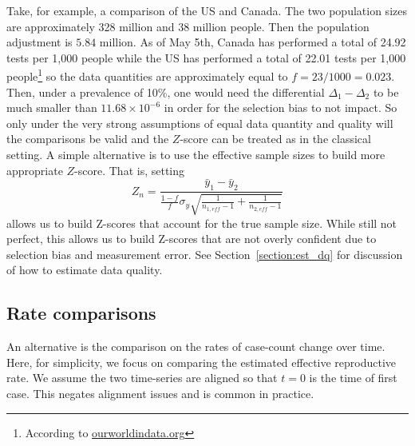 \documentclass[12pt]{amsart}
\numberwithin{equation}{section}
\theoremstyle{plain}
\begin{document}
Take, for example, a comparison of the US and Canada.  The two population sizes are approximately 328 million and 38 million people.  Then the population adjustment is $5.84$ million. As of May 5th, Canada has performed a total of 24.92 tests per 1,000 people while the US has performed a total of 22.01 tests per 1,000 people\footnote{According to \href{https://ourworldindata.org/grapher/full-list-cumulative-total-tests-per-thousand}{ourworldindata.org}} so the data quantities are approximately equal to $f = 23/1000 = 0.023$.  Then, under a prevalence of 10\%, one would need the differential $\Delta_1-\Delta_2$ to be much smaller than $11.68 \times 10^{-6}$ in order for the selection bias to not impact.  So only under the very strong assumptions of equal data quantity and quality will the comparisons be valid and the $Z$-score can be treated as in the classical setting.  A simple alternative is to use the effective sample sizes to build more appropriate $Z$-score.  That is, setting
$$
Z_n = \frac{\bar y_1 - \bar y_2}{ \frac{1-f}{f} \sigma_y \sqrt{ \frac{1}{n_{1,eff} - 1} + \frac{1}{n_{2,eff} - 1}}}
$$
allows us to build Z-scores that account for the true sample size.  While still not perfect, this allows us to build Z-scores that are not overly confident due to selection bias and measurement error.  See Section~\ref{section:est_dq} for discussion of how to estimate data quality.

\subsection{Rate comparisons}

An alternative is the comparison on the rates of case-count change over time.  Here, for simplicity, we focus on comparing the estimated effective reproductive rate.  We assume the two time-series are aligned so that $t=0$ is the time of first case.  This negates alignment issues and is common in practice.
\end{document}

